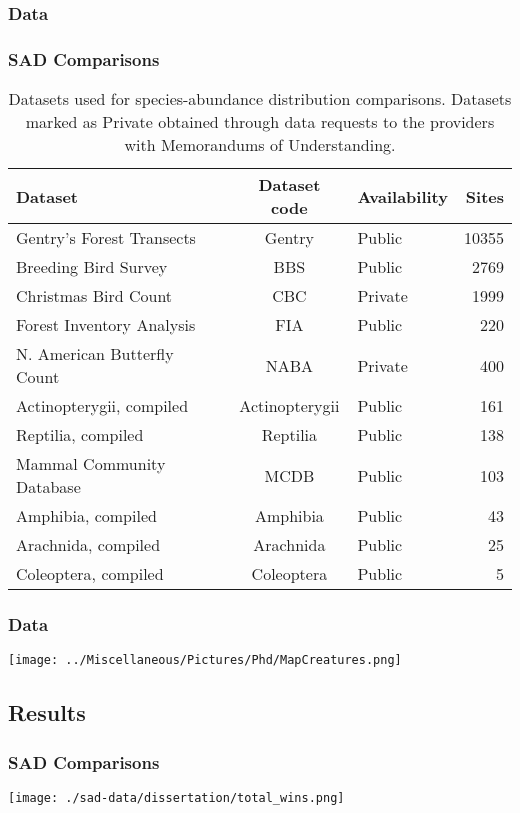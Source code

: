 \documentclass[14pt]{beamer}
\begin{document}
\subsubsection{Data}
\begin{frame}[shrink=35]
\frametitle{SAD Comparisons}
\begin{center}
\begin{table}
\begin{tabular}{l|c|l|r}
 Dataset &Dataset code &Availability &Sites\\
\hline
 Gentry's Forest Transects &Gentry &Public &10355\\
 Breeding Bird Survey &BBS &Public &2769\\
 Christmas Bird Count &CBC &Private &1999\\
 Forest Inventory Analysis &FIA	 &Public &220\\
 N. American Butterfly Count &NABA &Private &400\\
 Actinopterygii, compiled &Actinopterygii &Public &161\\
 Reptilia, compiled &Reptilia &Public &138\\
 Mammal Community Database &MCDB &Public &103\\
 Amphibia, compiled &Amphibia &Public &43\\
 Arachnida, compiled &Arachnida &Public &25\\
 Coleoptera, compiled &Coleoptera &Public &5\\
\end{tabular}
\caption{Datasets used for species-abundance distribution comparisons. Datasets marked as Private obtained through data requests to the providers with Memorandums of Understanding.}
\end{table}
\end{center}
\end{frame}

\begin{frame}{}
\frametitle{Data}
\texttt{[image: ../Miscellaneous/Pictures/Phd/MapCreatures.png]}
\end{frame}


\subsection{Results}
\begin{frame}{}
\frametitle{SAD Comparisons}
\texttt{[image: ./sad-data/dissertation/total\_wins.png]}
\end{frame}
\end{document}
